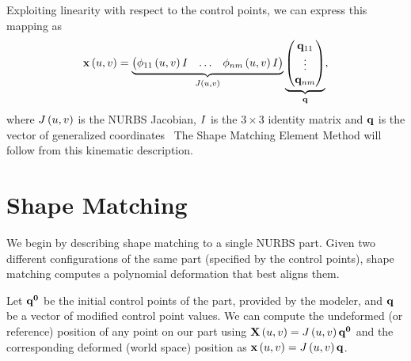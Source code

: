 Exploiting linearity with respect to the control points, we can express this mapping as
\begin{equation}
    \mathbf{x}\left(u,v\right) = \underbrace{\begin{pmatrix} \phi_{11}\left(u,v\right)I & \dots & \phi_{nm}\left(u,v\right)I \end{pmatrix}}_{J\left(u,v\right)}
    \underbrace{\begin{pmatrix} \mathbf{q}_{11} \\ \vdots \\ \mathbf{q}_{nm}\end{pmatrix}}_{\mathbf{q}},
\end{equation} where $J\left(u,v\right)$ is the NURBS Jacobian, $I$ is the $3\times3$ identity matrix and $\mathbf{q}$ is the vector of generalized coordinates~\cite{lanczos2012variational}
The Shape Matching Element Method will follow from this kinematic description.

\section{Shape Matching}
\label{sec:shapematching}

We begin by describing shape matching to a single NURBS part. 
Given two different configurations of the same part (specified by the control points), shape matching computes a polynomial deformation that best aligns them.

Let $\mathbf{q^0}$ be the initial control points of the part, provided by the modeler, and $\mathbf{q}$ be a vector of modified control point values.
We can compute the undeformed (or reference) position of any point on our part using $\mathbf{X}\left(u,v\right) = J\left(u,v\right)\mathbf{q^0}$ and the corresponding
deformed (world space) position as $\mathbf{x}\left(u,v\right) = J\left(u,v\right)\mathbf{q}$.

